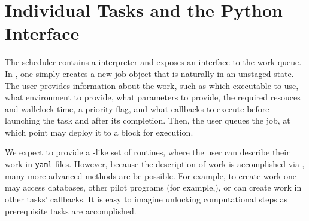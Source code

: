 \section{Individual Tasks and the Python Interface}
\label{sec:python}

The scheduler contains a \python interpreter and exposes an interface to the work queue.
In \python, one simply creates a new job object that is naturally in an unstaged state.
The user provides information about the work, such as which executable to use, what environment to provide, what parameters to provide, the required resouces and wallclock time, a priority flag, and what callbacks to execute before launching the task and after its completion.
Then, the user queues the job, at which point \jmscheduler may deploy it to a block for execution.

We expect to provide a \metaq-like set of routines, where the user can describe their work in \texttt{yaml}\cite{YAML} files.
However, because the description of work is accomplished via \python, many more advanced methods are be possible.
For example, to create work one may access databases, other pilot programs (for example,\cite{taxi1,taxi2}), or can create work in other tasks' callbacks.
It is easy to imagine unlocking computational steps as prerequisite tasks are accomplished.
